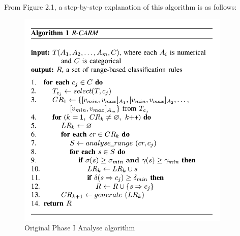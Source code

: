 From Figure 2.1, a step-by-step explanation of this algorithm is as follows: 

\begin{figure}[h]
    \centering
    \includegraphics[width=4in]{figures/DrShaoAlgorithm1}
    \caption[Original Phase I Analyse algorithm]{Original Phase I Analyse algorithm}
    \label{fig:figure2_1}
\end{figure}


